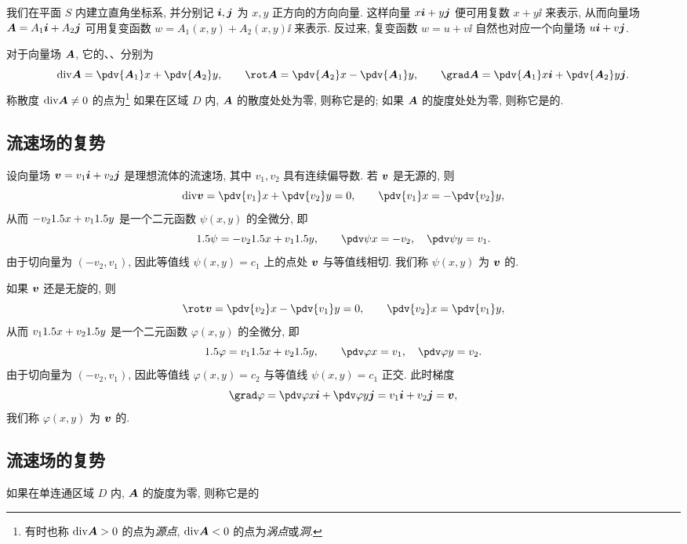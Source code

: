 我们在平面 $S$ 内建立直角坐标系, 并分别记 ${\boldsymbol{i}},{\boldsymbol{j}}$ 为 $x,y$ 正方向的方向向量.
这样向量 $x{\boldsymbol{i}}+y{\boldsymbol{j}}$ 便可用复数 $x+y\ii$ 来表示, 从而向量场 ${\boldsymbol{A}}=A_1{\boldsymbol{i}}+A_2{\boldsymbol{j}}$ 可用复变函数 $w=A_1(x,y)+A_2(x,y)\ii$ 来表示.
反过来, 复变函数 $w=u+v\ii$ 自然也对应一个向量场 $u{\boldsymbol{i}}+v{\boldsymbol{j}}$.

对于向量场 ${\boldsymbol{A}}$, 它的、、分别为
\[
  \div\bfA=\pdv{\bfA_1}x+\pdv{\bfA_2}y,\qquad
  \rot\bfA=\pdv{\bfA_2}x-\pdv{\bfA_1}y,\qquad
  \grad\bfA=\pdv{\bfA_1}x\bfi+\pdv{\bfA_2}y\bfj.
\]
称散度 ${\mathrm{div}}{\boldsymbol{A}}\neq0$ 的点为\footnote{
  有时也称 ${\mathrm{div}}{\boldsymbol{A}}>0$ 的点为\emph{源点}, ${\mathrm{div}}{\boldsymbol{A}}<0$ 的点为\emph{涡点}或\emph{洞}.
}
如果在区域 $D$ 内, ${\boldsymbol{A}}$ 的散度处处为零, 则称它是的;
如果 ${\boldsymbol{A}}$ 的旋度处处为零, 则称它是的.


\subsection{流速场的复势}

设向量场 ${\boldsymbol{v}}=v_1{\boldsymbol{i}}+v_2{\boldsymbol{j}}$ 是理想流体的流速场, 其中 $v_1,v_2$ 具有连续偏导数. \smallskip
若 ${\boldsymbol{v}}$ 是无源的, 则
\[
  \div\bfv=\pdv{v_1}x+\pdv{v_2}y=0,\qquad
  \pdv{v_1}x=-\pdv{v_2}y,
\]
从而 $-v_21.5 x+v_11.5 y$ 是一个二元函数 $\psi(x,y)$ 的全微分, 即
\[
  \d\psi=-v_2\d x+v_1\d y,\qquad
  \pdv\psi x=-v_2,\quad \pdv\psi y=v_1.
\]
由于切向量为 $(-v_2,v_1)$, 因此等值线 $\psi(x,y)=c_1$ 上的点处 ${\boldsymbol{v}}$ 与等值线相切.
我们称 $\psi(x,y)$ 为 ${\boldsymbol{v}}$ 的.

如果 ${\boldsymbol{v}}$ 还是无旋的, 则
\[
  \rot\bfv=\pdv{v_2}x-\pdv{v_1}y=0,\qquad
  \pdv{v_2}x=\pdv{v_1}y,
\]
从而 $v_11.5 x+v_21.5 y$ 是一个二元函数 $\varphi(x,y)$ 的全微分, 即
\[
  \d\varphi=v_1\d x+v_2\d y,\qquad
  \pdv\varphi x=v_1,\quad \pdv\varphi y=v_2.
\]
由于切向量为 $(-v_2,v_1)$, 因此等值线 $\varphi(x,y)=c_2$ 与等值线 $\psi(x,y)=c_1$ 正交.
此时梯度
\[
  \grad\varphi=\pdv\varphi x\bfi+\pdv\varphi y\bfj
  =v_1\bfi+v_2\bfj=\bfv,
\]
我们称 $\varphi(x,y)$ 为 ${\boldsymbol{v}}$ 的.





\subsection{流速场的复势}

如果在单连通区域 $D$ 内, ${\boldsymbol{A}}$ 的旋度为零, 则称它是的



